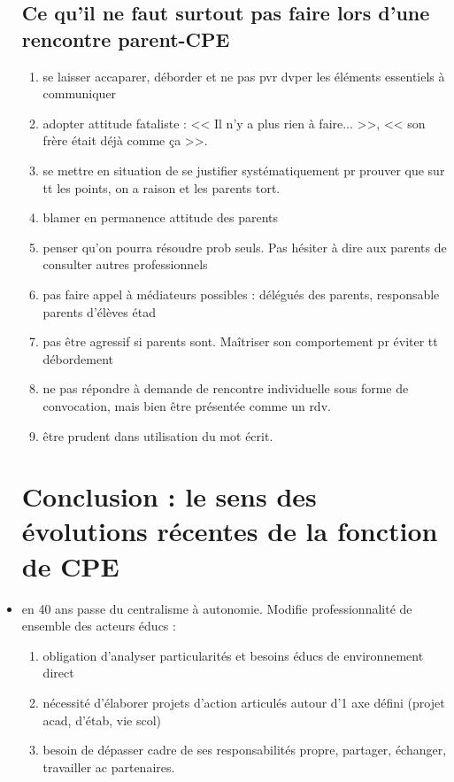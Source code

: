 \documentclass[12pt]{report}
\begin{document}
\begin{itemize}
\subsection{Ce qu'il ne faut surtout pas faire lors d'une rencontre parent-CPE}

\begin{enumerate}
\item se laisser accaparer, déborder et ne pas pvr dvper les éléments essentiels à communiquer\\
\item adopter attitude fataliste : << Il n'y a plus rien à faire... >>, << son frère était déjà comme ça >>. \\
\item se mettre en situation de se justifier systématiquement pr prouver que sur tt les points, on a raison et les parents tort. \\
\item blamer en permanence attitude des parents\\
\item penser qu'on pourra résoudre prob seuls. Pas hésiter à dire aux parents de consulter autres professionnels \\
\item pas faire appel à médiateurs possibles : délégués des parents, responsable parents d'élèves étad \\
\item pas être agressif si parents sont. Maîtriser son comportement pr éviter tt débordement\\
\item ne pas répondre à demande de rencontre individuelle sous forme de convocation, mais bien être présentée comme un rdv.\\
\item être prudent dans utilisation du mot écrit.
\end{enumerate}

\section{Conclusion : le sens des évolutions récentes de la fonction de CPE}

\item en 40 ans passe du centralisme à autonomie. Modifie professionnalité de ensemble des acteurs éducs : 
\begin{enumerate}
\item obligation d'analyser particularités et besoins éducs de environnement direct \\
\item nécessité d'élaborer projets d'action articulés autour d'1 axe défini (projet acad, d'étab, vie scol) \\
\item besoin de dépasser cadre de ses responsabilités propre, partager, échanger, travailler ac partenaires. \\


\end{enumerate}
\end{itemize}
\end{document}
